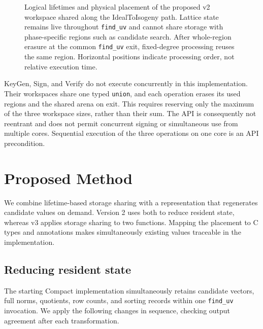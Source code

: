 \documentclass[a4paper,10pt]{article}
\theoremstyle{definition}
\theoremstyle{remark}
\begin{document}
\begin{figure}[H]
  \centering
  
  \caption{Logical lifetimes and physical placement of the proposed v2 workspace shared along the IdealToIsogeny path. Lattice state remains live throughout \texttt{find\_uv} and cannot share storage with phase-specific regions such as candidate search. After whole-region erasure at the common \texttt{find\_uv} exit, fixed-degree processing reuses the same region. Horizontal positions indicate processing order, not relative execution time.}
  \label{fig:lifetime}
\end{figure}

KeyGen, Sign, and Verify do not execute concurrently in this implementation. Their workspaces share one typed \texttt{union}, and each operation erases its used regions and the shared arena on exit. This requires reserving only the maximum of the three workspace sizes, rather than their sum. The API is consequently not reentrant and does not permit concurrent signing or simultaneous use from multiple cores. Sequential execution of the three operations on one core is an API precondition.

\section{Proposed Method}
\label{sec:method}

We combine lifetime-based storage sharing with a representation that regenerates candidate values on demand. Version 2 uses both to reduce resident state, whereas v3 applies storage sharing to two functions. Mapping the placement to C types and annotations makes simultaneously existing values traceable in the implementation.

\subsection{Reducing resident state}

The starting Compact implementation simultaneously retains candidate vectors, full norms, quotients, row counts, and sorting records within one \texttt{find\_uv} invocation. We apply the following changes in sequence, checking output agreement after each transformation.
\end{document}
